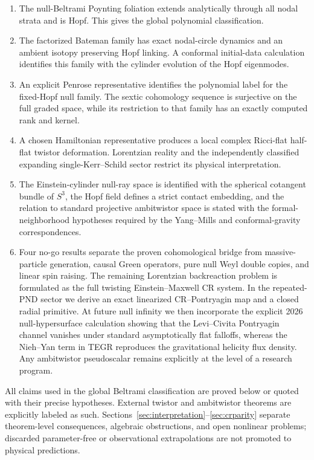 \documentclass[aps,prd,reprint,nofootinbib,superscriptaddress]{revtex4-2}
\theoremstyle{definition}
\theoremstyle{remark}
\begin{document}
\begin{enumerate}
\item The null-Beltrami Poynting foliation extends analytically through all nodal strata and is Hopf. This gives the global polynomial classification.
\item The factorized Bateman family has exact nodal-circle dynamics and an ambient isotopy preserving Hopf linking. A conformal initial-data calculation identifies this family with the cylinder evolution of the Hopf eigenmodes.
\item An explicit Penrose representative identifies the polynomial label for the fixed-Hopf null family. The sextic cohomology sequence is surjective on the full graded space, while its restriction to that family has an exactly computed rank and kernel.
\item A chosen Hamiltonian representative produces a local complex Ricci-flat half-flat twistor deformation. Lorentzian reality and the independently classified expanding single-Kerr--Schild sector restrict its physical interpretation.
\item The Einstein-cylinder null-ray space is identified with the spherical cotangent bundle of $S^3$, the Hopf field defines a strict contact embedding, and the relation to standard projective ambitwistor space is stated with the formal-neighborhood hypotheses required by the Yang--Mills and conformal-gravity correspondences.
\item Four no-go results separate the proven cohomological bridge from massive-particle generation, causal Green operators, pure null Weyl double copies, and linear spin raising. The remaining Lorentzian backreaction problem is formulated as the full twisting Einstein--Maxwell CR system. In the repeated-PND sector we derive an exact linearized CR--Pontryagin map and a closed radial primitive. At future null infinity we then incorporate the explicit 2026 null-hypersurface calculation showing that the Levi--Civita Pontryagin channel vanishes under standard asymptotically flat falloffs, whereas the Nieh--Yan term in TEGR reproduces the gravitational helicity flux density. Any ambitwistor pseudoscalar remains explicitly at the level of a research program.
\end{enumerate}

All claims used in the global Beltrami classification are proved below or quoted with their precise hypotheses. External twistor and ambitwistor theorems are explicitly labeled as such. Sections~\ref{sec:interpretation}--\ref{sec:crparity} separate theorem-level consequences, algebraic obstructions, and open nonlinear problems; discarded parameter-free or observational extrapolations are not promoted to physical predictions.
\end{document}
